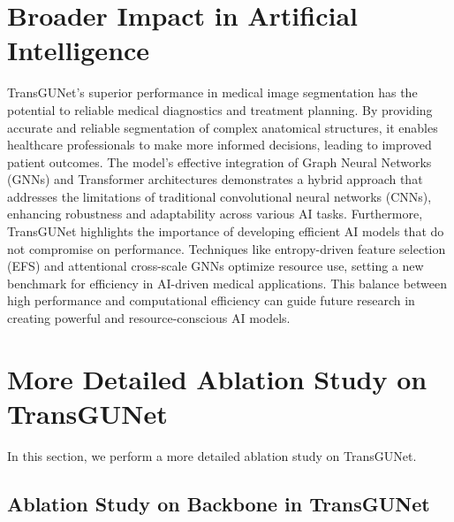 \section{Broader Impact in Artificial Intelligence}

TransGUNet’s superior performance in medical image segmentation has the potential to reliable medical diagnostics and treatment planning. By providing accurate and reliable segmentation of complex anatomical structures, it enables healthcare professionals to make more informed decisions, leading to improved patient outcomes. The model’s effective integration of Graph Neural Networks (GNNs) and Transformer architectures demonstrates a hybrid approach that addresses the limitations of traditional convolutional neural networks (CNNs), enhancing robustness and adaptability across various AI tasks. Furthermore, TransGUNet highlights the importance of developing efficient AI models that do not compromise on performance. Techniques like entropy-driven feature selection (EFS) and attentional cross-scale GNNs optimize resource use, setting a new benchmark for efficiency in AI-driven medical applications. This balance between high performance and computational efficiency can guide future research in creating powerful and resource-conscious AI models.

\section{More Detailed Ablation Study on TransGUNet}
In this section, we perform a more detailed ablation study on TransGUNet.

\subsection{Ablation Study on Backbone in TransGUNet}


